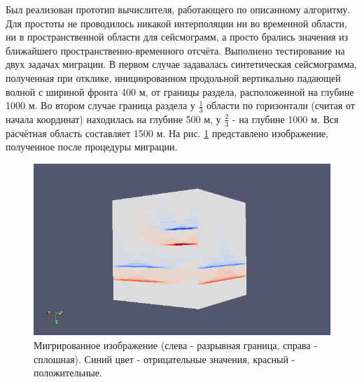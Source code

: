 \documentclass{article}
\begin{document}
Был реализован прототип вычислителя, работающего по описанному алгоритму.
Для простоты не проводилось никакой интерполяции ни во временной области, ни в пространственной области для сейсмограмм, а просто брались значения из ближайшего пространственно-временного отсчёта.
Выполнено тестирование на двух задачах миграции.
В первом случае задавалась синтетическая сейсмограмма, полученная при отклике, инициированном продольной вертикально падающей волной с шириной фронта 400 м, от границы раздела, расположенной на глубине 1000 м.
Во втором случае граница раздела у $\frac{1}{3}$ области по горизонтали (считая от начала координат) находилась на глубине 500 м, у $\frac{2}{3}$ - на глубине 1000 м.
Вся расчётная область составляет 1500 м.
На рис. \ref{layers_inverted} представлено изображение, полученное после процедуры миграции.
\begin{figure}[ht]
  \center
  \includegraphics[scale=0.5]{pic/layers_inverted.png}
  \caption{Мигрированное изображение (слева - разрывная граница, справа - сплошная). Синий цвет - отрицательные значения, красный - положительные.}
\label{layers_inverted}
\end{figure}
\end{document}
